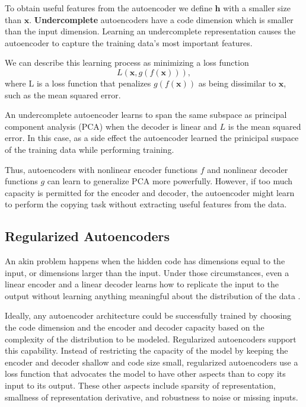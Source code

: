 To obtain useful features from the autoencoder we define $\textbf{h}$ with a smaller size
than $\textbf{x}$. \textbf{Undercomplete} autoencoders have a code dimension
which is smaller than the input dimension. Learning an undercomplete
representation causes the autoencoder to capture the training data's most
important features. 

We can describe this learning process as minimizing a loss function
\begin{equation}
    L(\textbf{x}, g(f(\textbf{x}))),
\end{equation}
where L is a loss function that penalizes $g(f(\textbf{x}))$ as being dissimilar
to $\textbf{x}$, such as the mean squared error. 

An undercomplete autoencoder learns to span the same subspace as principal
component analysis (PCA) when the decoder is linear and $L$ is the mean squared
error. In this case, as a side effect the autoencoder learned the prinicipal
suspace of the training data while performing training.

Thus, autoencoders with nonlinear encoder functions $f$ and nonlinear decoder
functions $g$ can learn to generalize PCA more powerfully. However, if too much
capacity is permitted for the encoder and decoder, the autoencoder might learn to
perform the copying task without extracting useful features from the data. 

\subsection{Regularized Autoencoders}
An akin problem happens when the hidden code has dimensions equal to the input,
or dimensions larger than the input. Under those circumstances, even a linear
encoder and a linear decoder learns how to replicate the input to the output
without learning anything meaningful about the distribution of the data  
\cite{makhzani2015adversarial}.

Ideally, any autoencoder architecture could be successfully trained by choosing
the code dimension and the encoder and decoder capacity based on the complexity
of the distribution to be modeled. Regularized autoencoders support this
capability. Instead of restricting the capacity of the model by keeping the
encoder and decoder shallow and code size small, regularized autoencoders use a
loss function that advocates the model to have other aspects than to copy its
input to its output. These other aspects include sparsity of representation,
smallness of representation derivative, and robustness to noise or missing
inputs. 

